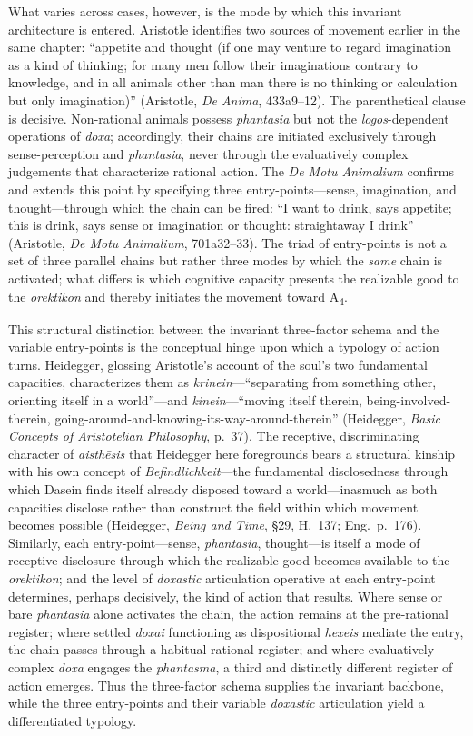 \documentclass{article}
\begin{document}
What varies across cases, however, is the mode by which this invariant architecture is entered. Aristotle identifies two sources of movement earlier in the same chapter: ``appetite and thought (if one may venture to regard imagination as a kind of thinking; for many men follow their imaginations contrary to knowledge, and in all animals other than man there is no thinking or calculation but only imagination)'' (Aristotle, \textit{De Anima}, 433a9--12). The parenthetical clause is decisive. Non-rational animals possess \textit{phantasia} but not the \textit{logos}-dependent operations of \textit{doxa}; accordingly, their chains are initiated exclusively through sense-perception and \textit{phantasia}, never through the evaluatively complex judgements that characterize rational action. The \textit{De Motu Animalium} confirms and extends this point by specifying three entry-points---sense, imagination, and thought---through which the chain can be fired: ``I want to drink, says appetite; this is drink, says sense or imagination or thought: straightaway I drink'' (Aristotle, \textit{De Motu Animalium}, 701a32--33). The triad of entry-points is not a set of three parallel chains but rather three modes by which the \textit{same} chain is activated; what differs is which cognitive capacity presents the realizable good to the \textit{orektikon} and thereby initiates the movement toward A\textsubscript{4}.

This structural distinction between the invariant three-factor schema and the variable entry-points is the conceptual hinge upon which a typology of action turns. Heidegger, glossing Aristotle's account of the soul's two fundamental capacities, characterizes them as \textit{krinein}---``separating from something other, orienting itself in a world''---and \textit{kinein}---``moving itself therein, being-involved-therein, going-around-and-knowing-its-way-around-therein'' (Heidegger, \textit{Basic Concepts of Aristotelian Philosophy}, p.~37). The receptive, discriminating character of \textit{aisthēsis} that Heidegger here foregrounds bears a structural kinship with his own concept of \textit{Befindlichkeit}---the fundamental disclosedness through which Dasein finds itself already disposed toward a world---inasmuch as both capacities disclose rather than construct the field within which movement becomes possible (Heidegger, \textit{Being and Time}, \S29, H.~137; Eng.~p.~176). Similarly, each entry-point---sense, \textit{phantasia}, thought---is itself a mode of receptive disclosure through which the realizable good becomes available to the \textit{orektikon}; and the level of \textit{doxastic} articulation operative at each entry-point determines, perhaps decisively, the kind of action that results. Where sense or bare \textit{phantasia} alone activates the chain, the action remains at the pre-rational register; where settled \textit{doxai} functioning as dispositional \textit{hexeis} mediate the entry, the chain passes through a habitual-rational register; and where evaluatively complex \textit{doxa} engages the \textit{phantasma}, a third and distinctly different register of action emerges. Thus the three-factor schema supplies the invariant backbone, while the three entry-points and their variable \textit{doxastic} articulation yield a differentiated typology.
\end{document}
